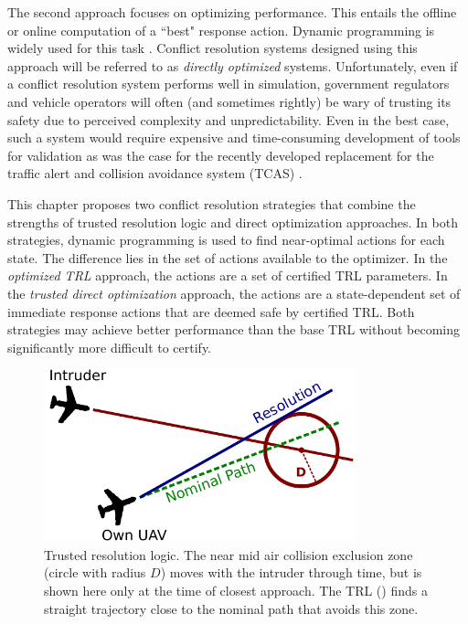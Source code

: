 The second approach focuses on optimizing performance.
This entails the offline or online  computation of a ``best" response action. Dynamic programming is widely used for this task \cite{ST-MJK-LPK-TLP-JKK:10,MJK-JPC:11,MJK-JPC-LPK-TL:10,LPK-TL:09,HB-DH-MJK-WSL:12,JEH-MJK-WAO:13}. 
Conflict resolution systems designed using this approach will be referred to as \emph{directly optimized} systems. 
Unfortunately, even if a conflict resolution system performs well in simulation, government regulators and vehicle operators will often (and sometimes rightly) be wary of trusting its safety due to perceived complexity and unpredictability.
Even in the best case, such a system would require expensive and time-consuming development of tools for validation as was the case for the recently developed replacement for the traffic alert and collision avoidance system (TCAS) \cite{JEH-MJK-WAO:13}. 

This chapter proposes two conflict resolution strategies that combine the strengths of trusted resolution logic and direct optimization approaches.
In both strategies, dynamic programming is used to find near-optimal actions for each state.
The difference lies in the set of actions available to the optimizer.
In the \emph{optimized TRL} approach, the actions are a set of certified TRL parameters.
In the \emph{trusted direct optimization} approach, the actions are a state-dependent set of immediate response actions that are deemed safe by certified TRL.
Both strategies may achieve better performance than the base TRL without becoming significantly more difficult to certify.

\begin{figure}
    \centering
    \includegraphics[height=5.0cm]{media/simple_trl.pdf}
    \caption[Trusted resolution logic]{Trusted resolution logic. The near mid air collision exclusion zone (circle with radius $D$) moves with the intruder through time, but is shown here only at the time of closest approach. The TRL () finds a straight trajectory close to the nominal path that avoids this zone.}
    \label{fig:trl}
\end{figure}

